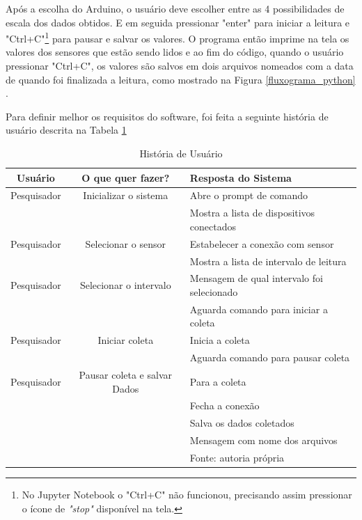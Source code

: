 		Após a escolha do Arduino, o usuário deve escolher entre as 4 possibilidades de escala dos dados obtidos. E em seguida pressionar "enter" para iniciar a leitura e "Ctrl+C"\footnote{No Jupyter Notebook o "Ctrl+C" não funcionou, precisando assim pressionar o ícone de \textit{"stop"} disponível na tela.} para pausar e salvar os valores. O programa então imprime na tela os valores dos sensores que estão sendo lidos e ao fim do código, quando o usuário pressionar "Ctrl+C", os valores são salvos em dois arquivos nomeados com a data de quando foi finalizada a leitura, como mostrado na Figura \ref{fluxograma_python} .
		
		Para definir melhor os requisitos do software, foi feita a seguinte história de usuário descrita na Tabela \ref{User_story}
		
			\begin{table}[h] \footnotesize
			\centering
			\caption{História de Usuário}
			\label{User_story}
			
			\begin{tabular}{ccl}
				\toprule
				\textbf{Usuário} & \textbf{O que quer fazer?} & \textbf{Resposta do Sistema} \\
				\midrule
				Pesquisador & Inicializar o sistema &  Abre o prompt de comando \\
				 & & Mostra a lista de dispositivos conectados \\
				Pesquisador & Selecionar o sensor & Estabelecer a conexão com sensor \\
				& & Mostra a lista de intervalo de leitura\\
				Pesquisador & Selecionar o intervalo & Mensagem de qual intervalo foi selecionado\\
				& & Aguarda comando para iniciar a coleta\\
				Pesquisador & Iniciar coleta & Inicia a coleta\\
				& &  Aguarda comando para pausar coleta\\
				Pesquisador & Pausar coleta e salvar Dados & Para a coleta\\
				& & Fecha a conexão\\
				& & Salva os dados coletados\\
				& & Mensagem com nome dos arquivos\\  
 				
				\bottomrule
				 & & Fonte: autoria própria
			\end{tabular}
		\end{table}
		
